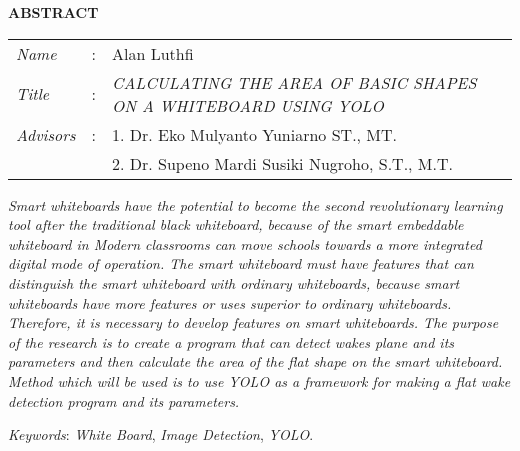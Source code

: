 \begin{center}
  \large\textbf{ABSTRACT}
\end{center}


\vspace{2ex}

\begingroup
  \setlength{\tabcolsep}{0pt}

  \noindent
  \begin{tabularx}{\textwidth}{l >{\centering}m{3em} X}
    \emph{Name}     &:& Alan Luthfi \\

    \emph{Title}    &:& \emph{CALCULATING THE AREA OF BASIC SHAPES ON A WHITEBOARD USING YOLO} \\

    \emph{Advisors} &:& 1. Dr. Eko Mulyanto Yuniarno ST., MT. \\
                    & & 2. Dr. Supeno Mardi Susiki Nugroho, S.T., M.T. \\
  \end{tabularx}
\endgroup

\emph{Smart whiteboards have the potential to become the second revolutionary learning tool
	after the traditional black whiteboard, because of the smart embeddable whiteboard in
	Modern classrooms can move schools towards a more integrated digital mode of operation. The smart whiteboard must have features that can distinguish the smart whiteboard
	with ordinary whiteboards, because smart whiteboards have more features or uses
	superior to ordinary whiteboards. Therefore, it is necessary to develop features on smart whiteboards. The purpose of the research is to create a program that can detect wakes
	plane and its parameters and then calculate the area of the flat shape on the smart whiteboard. Method
	which will be used is to use YOLO as a framework for
	making a flat wake detection program and its parameters.}

\emph{Keywords}: \emph{White Board}, \emph{Image Detection}, \emph{YOLO}.
